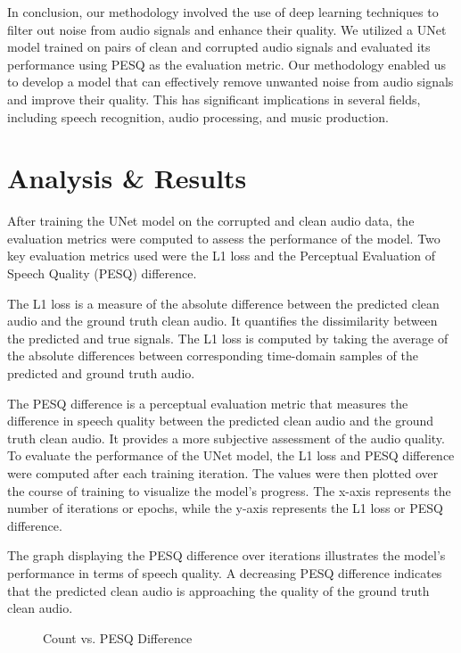 \documentclass[conference]{IEEEtran}
\begin{document}
In conclusion, our methodology involved the use of deep learning techniques to filter out noise from audio signals and enhance their quality. We utilized a UNet model trained on pairs of clean and corrupted audio signals and evaluated its performance using PESQ as the evaluation metric. Our methodology enabled us to develop a model that can effectively remove unwanted noise from audio signals and improve their quality. This has significant implications in several fields, including speech recognition, audio processing, and music production.

\section{Analysis \& Results}
After training the UNet model on the corrupted and clean audio data, the evaluation metrics were computed to assess the performance of the model. Two key evaluation metrics used were the L1 loss and the Perceptual Evaluation of Speech Quality (PESQ) difference.

The L1 loss is a measure of the absolute difference between the predicted clean audio and the ground truth clean audio. It quantifies the dissimilarity between the predicted and true signals. The L1 loss is computed by taking the average of the absolute differences between corresponding time-domain samples of the predicted and ground truth audio.

The PESQ difference is a perceptual evaluation metric that measures the difference in speech quality between the predicted clean audio and the ground truth clean audio. It provides a more subjective assessment of the audio quality. To evaluate the performance of the UNet model, the L1 loss and PESQ difference were computed after each training iteration. The values were then plotted over the course of training to visualize the model's progress. The x-axis represents the number of iterations or epochs, while the y-axis represents the L1 loss or PESQ difference.

The graph displaying the PESQ difference over iterations illustrates the model's performance in terms of speech quality. A decreasing PESQ difference indicates that the predicted clean audio is approaching the quality of the ground truth clean audio.

\begin{figure}[t!]
    \centering
    
    \caption{Count vs. PESQ Difference}
\end{figure}
\end{document}
